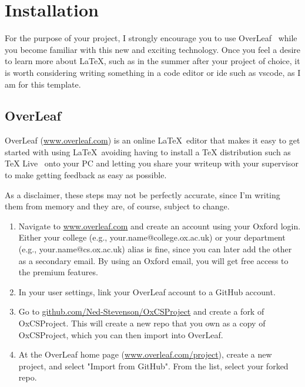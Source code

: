 \section{Installation}
\label{sec:installation}

For the purpose of your project, I strongly encourage you to use
OverLeaf~\cite{OverleafOnlineLaTeX} while you become familiar with this new and exciting
technology. Once you feel a desire to learn more about \LaTeX, such as in the summer after your
project of choice, it is worth considering writing something in a code editor or \acrshort{ide}
such as \acrfull{vscode}, as I am for this template.

\subsection{OverLeaf}
\label{sec:installation/OverLeaf}

OverLeaf (\url{www.overleaf.com}) is an online \LaTeX\ editor that makes it easy to get started
with using \LaTeX\, avoiding having to install a TeX distribution such as TeX
Live~\cite{TeXLiveTeX} onto your PC and letting you share your writeup with your supervisor to
make getting feedback as easy as possible.

As a disclaimer, these steps may not be perfectly accurate, since I'm writing them from memory and
they are, of course, subject to change.

\begin{enumerate}
	\item Navigate to \url{www.overleaf.com} and create an account using your Oxford login. Either
	      your college (e.g., your.name@college.ox.ac.uk) or your department (e.g.,
	      your.name@cs.ox.ac.uk) alias is fine, since you can later add the other as a secondary
	      email. By using an Oxford email, you will get free access to the premium features.
	\item In your user settings, link your OverLeaf account to a GitHub account.
	\item Go to \url{github.com/Ned-Stevenson/OxCSProject} and create a fork of OxCSProject. This
	      will create a new repo that you own as a copy of OxCSProject, which you can then import
	      into OverLeaf.
	\item At the OverLeaf home page (\url{www.overleaf.com/project}), create a new project, and
	      select "Import from GitHub". From the list, select your forked repo.
\end{enumerate}

